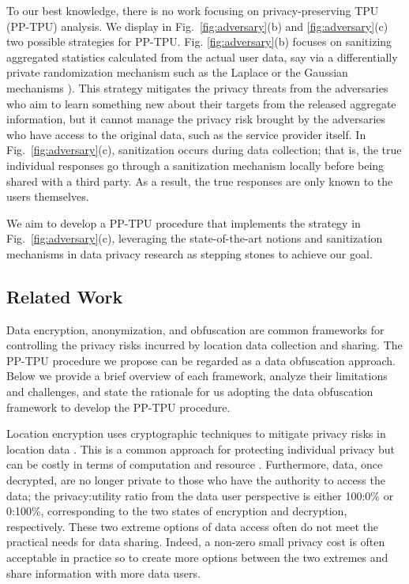 \documentclass[10pt,journal,compsoc]{IEEEtran}
\begin{document}
To our best knowledge,  there is no work focusing on privacy-preserving TPU (PP-TPU) analysis. We display in Fig.~\ref{fig:adversary}(b) and \ref{fig:adversary}(c) two possible strategies for PP-TPU. Fig. \ref{fig:adversary}(b) focuses on sanitizing aggregated statistics calculated from the actual user data, say via a differentially private randomization mechanism such as the Laplace \cite{dwork2006calibrating} or the Gaussian mechanisms \cite{dwork2014algorithmic,liu2018generalized}). This strategy  mitigates the privacy threats from the adversaries who aim to learn something new  about their targets from the released aggregate information, but it cannot manage the privacy risk brought by the adversaries who have access to the original data, such as the service provider itself. In Fig.~\ref{fig:adversary}(c), sanitization occurs during data collection; that is, the true individual responses go through a sanitization mechanism locally before being shared with a third party. As a result, the true responses are only known to the users themselves. 

We aim to develop a PP-TPU procedure that  implements the strategy in Fig.~\ref{fig:adversary}(c), leveraging the state-of-the-art notions and sanitization mechanisms in data privacy research as stepping stones to achieve our goal. 

\vspace{-12pt}\subsection{Related Work}\vspace{-6pt}
Data encryption, anonymization, and obfuscation are common frameworks for controlling the privacy risks incurred by location data collection and sharing. The PP-TPU procedure we propose can be regarded as a data obfuscation approach. Below we provide a brief overview of each framework,  analyze their limitations and challenges, and state the rationale for us adopting the data obfuscation framework to develop the PP-TPU procedure. 

Location encryption uses cryptographic techniques to mitigate privacy risks in location data \cite{zhong2007louis, popa2011privacy, zhu2011applaus, mascetti2011privacy, li2019privacy,zhu2019traffic, zhang2019privacy}. This is a common approach for protecting individual privacy but can be costly in terms of computation and resource \cite{zhou2019privacy}. Furthermore,  data, once decrypted,  are no longer private to those who have the authority to access the data; the privacy:utility ratio from the data user perspective is either 100:0\% or 0:100\%, corresponding to the two states of encryption and decryption, respectively.  These two extreme options of data access often do not meet the practical needs for data sharing. Indeed, a non-zero small privacy cost is often acceptable in practice so to create more options between the two extremes and  share information with more data users.
\end{document}
